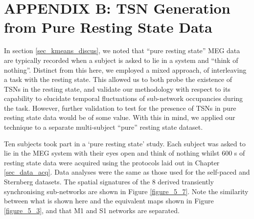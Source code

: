 \section{APPENDIX B: TSN Generation from Pure Resting State Data}\label{sec_kmeans_app1}
In section \ref{sec_kmeans_discus}, we noted that “pure resting state” MEG data are typically recorded when a subject is asked to lie in a system and “think of nothing”. Distinct from this here, we employed a mixed approach, of interleaving a task with the resting state. This allowed us to both probe the existence of TSNs in the resting state, and validate our methodology with respect to its capability to elucidate temporal fluctuations of sub-network occupancies during the task. However, further validation to test for the presence of TSNs in pure resting state data would be of some value. With this in mind, we applied our technique to a separate multi-subject “pure” resting state dataset. 

Ten subjects took part in a ‘pure resting state’ study. Each subject was asked to lie in the MEG system with their eyes open and think of nothing whilst 600 s of resting state data were acquired using the protocols laid out in Chapter \ref{sec_data_acq}. Data analyses were the same as those used for the self-paced and Sternberg datasets. The spatial signatures of the 8 derived transiently synchronising sub-networks are shown in Figure \ref{figure_5_7}. Note the similarity between what is shown here and the equivalent maps shown in Figure \ref{figure_5_3}, and that M1 and S1 networks are separated.

